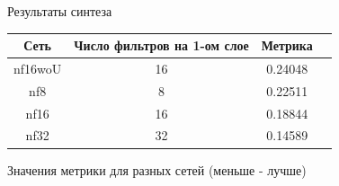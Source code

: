 \documentclass[12pt]{beamer}
\begin{document}
	\begin{frame}{Результаты синтеза}
		\begin{table}[h!]
			\begin{center}
				\begin{tabular}{|c|c|c|c|}
					\hline
					Сеть & Число фильтров на 1-ом слое & Метрика \\
					\hline
					nf16woU & 16 & 0.24048\\
					\hline
					nf8 & 8 & 0.22511\\
					\hline
					nf16 & 16 & 0.18844\\
					\hline
					nf32 & 32 & 0.14589\\
					\hline
				\end{tabular}
				\vfill
				Значения метрики для разных сетей (меньше - лучше)
			\end{center}
		\end{table}
	\end{frame}
	
\end{document}
